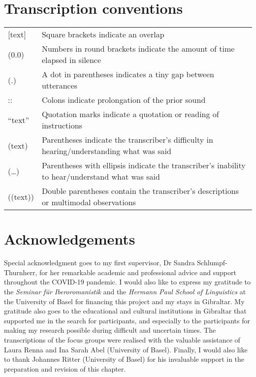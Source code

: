 \documentclass[output=paper]{langscibook}
\begin{document}
\section*{Transcription conventions}
\begin{tabularx}{\textwidth}{lQ}
[text]&	Square brackets indicate an overlap \\
(0.0)&	Numbers in round brackets indicate the amount of time elapsed in silence\\
(.)&	A dot in parentheses indicates a tiny gap between utterances\\
::&	Colons indicate prolongation of the prior sound\\
“text”&	Quotation marks indicate a quotation or reading of instructions\\
(text) &	Parentheses indicate the transcriber’s difficulty in hearing/understanding what was said\\
(…) &	Parentheses with ellipsis indicate the transcriber’s inability to hear/understand what was said\\
((text))	& Double parentheses contain the transcriber’s descriptions or multimodal observations
\end{tabularx}

\section*{Acknowledgements}

Special acknowledgment goes to my first supervisor, Dr Sandra Schlumpf-Thurn\-herr, for her remarkable academic and professional advice and support throughout the COVID-19 pandemic. I would also like to express my gratitude to the \textit{Seminar für Iberoromanistik} and the \textit{Hermann Paul School of Linguistics} at the University of Basel for financing this project and my stays in Gibraltar. My gratitude also goes to the educational and cultural institutions in Gibraltar that supported me in the search for participants, and especially to the participants for making my research possible during difficult and uncertain times. The transcriptions of the focus groups were realised with the valuable assistance of Laura Renna and Ina Sarah Abel (University of Basel). Finally, I would also like to thank Johannes Ritter (University of Basel) for his invaluable support in the preparation and revision of this chapter.


\printbibliography[heading=subbibliography, notkeyword=this]
\end{document}

